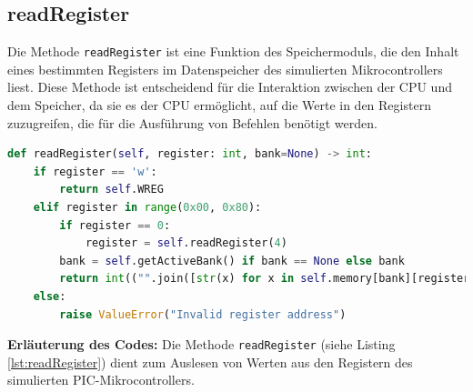 
\subsection{readRegister}

Die Methode \texttt{readRegister} ist eine Funktion des Speichermoduls, die den Inhalt eines bestimmten Registers im Datenspeicher des simulierten Mikrocontrollers liest. Diese Methode ist entscheidend für die Interaktion zwischen der \ac{CPU} und dem Speicher, da sie es der \ac{CPU} ermöglicht, auf die Werte in den Registern zuzugreifen, die für die Ausführung von Befehlen benötigt werden.

\begin{lstlisting}[language=Python, caption={Ausschnitt der readRegister-Methode im Speichermodul}, label={lst:readRegister}]
def readRegister(self, register: int, bank=None) -> int:
    if register == 'w':
        return self.WREG
    elif register in range(0x00, 0x80):
        if register == 0:
            register = self.readRegister(4)
        bank = self.getActiveBank() if bank == None else bank
        return int(("".join([str(x) for x in self.memory[bank][register]])),2)
    else:
        raise ValueError("Invalid register address")
\end{lstlisting}
\textbf{Erläuterung des Codes:}
Die Methode \texttt{readRegister} (siehe Listing \ref{lst:readRegister}) dient zum Auslesen von Werten aus den Registern des simulierten PIC-Mikrocontrollers.
